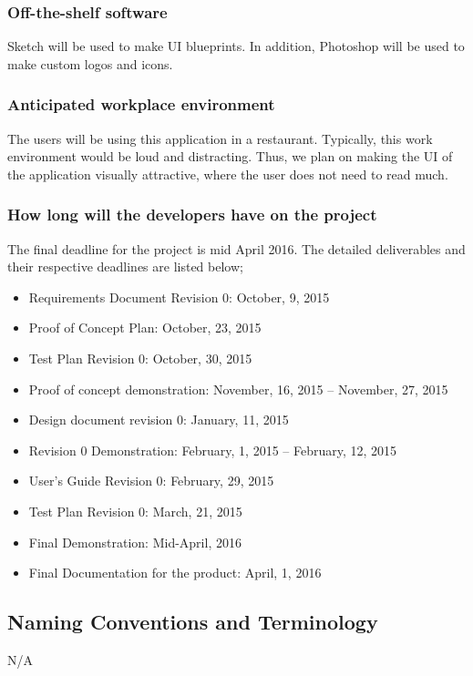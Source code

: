 \documentclass[12pt, titlepage]{article}
\begin{document}
\subsubsection{Off-the-shelf software}
Sketch will be used to make UI blueprints. In addition, Photoshop will be used to make custom logos and icons. \newline\newline

\subsubsection{Anticipated workplace environment}
The users will be using this application in a restaurant. Typically, this work environment would be loud and distracting. Thus, we plan on making the UI of the application visually attractive, where the user does not need to read much.  \newline\newline

\subsubsection{How long will the developers have on the project}
The final deadline for the project is mid April 2016. The detailed deliverables and their respective deadlines are listed below;
\begin{itemize}
  \item Requirements Document Revision 0: October, 9, 2015 
  \item Proof of Concept Plan: October, 23, 2015
  \item 	Test Plan Revision 0: October, 30, 2015
  \item 	Proof of concept demonstration: November, 16, 2015  – November, 27, 2015
  \item Design document revision 0: January, 11, 2015
  \item Revision 0 Demonstration: February, 1, 2015  – February, 12, 2015
  \item User’s Guide Revision 0: February, 29, 2015
  \item 	Test Plan Revision 0: March, 21, 2015
  \item Final Demonstration: Mid-April, 2016
  \item 	Final Documentation for the product: April, 1, 2016
\end{itemize}


\subsection{Naming Conventions and Terminology}
N/A
\end{document}

